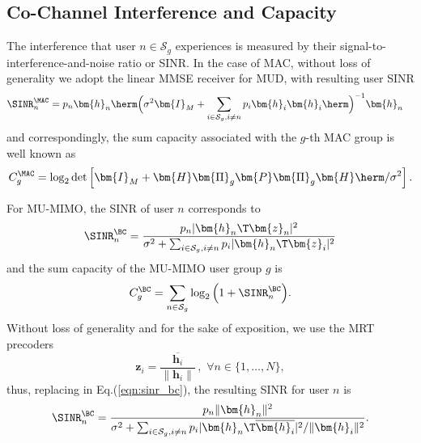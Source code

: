\subsection{Co-Channel Interference and Capacity}
The interference that user $n\in\mathcal{S}_g$ experiences is measured by their signal-to-interference-and-noise ratio or SINR. In the case of MAC, without loss of generality we adopt the linear MMSE receiver for MUD, with resulting user SINR \cite{Tse05}
\begin{align}
	\SINR_n^{\MAC}&=p_n\bm{h}_n\herm\Big(\sigma^2\bm{I}_M+\sum_{i\in\mathcal{S}_{g},i\neq n}p_i\bm{h}_i\bm{h}_i\herm\Big)^{-1}\bm{h}_n
	\label{eqn:sinr_mac}
\end{align}
and correspondingly, the sum capacity associated with the $g$-th MAC group is well known as
\begin{equation}
	C_g^{\MAC}={\log _2}\det\left[ \bm{I}_M + \bm{H}\bm{\Pi}_g\bm{P}\bm{\Pi}_g\bm{H}\herm/\sigma^2 \right].\label{eqn:cap_mac}
\end{equation}

For MU-MIMO, the SINR of user $n$ corresponds to 
\begin{equation}
	\SINR_n^{\BC} = \frac{p_n|\bm{h}_n\T\bm{z}_n|^2}{\sigma^2+\sum_{i\in\mathcal{S}_{g},i\neq n}p_i|\bm{h}_n\T\bm{z}_i|^2}
	\label{eqn:sinr_bc}
\end{equation}
and the sum capacity of the MU-MIMO user group $g$ is 
\begin{equation}
	C_g^{\BC}=\sum_{n\in\mathcal{S}_g}\log_2\Big(1+\SINR_n^{\BC}\Big).\label{eqn:cap_bc}
\end{equation}
Without loss of generality and for the sake of exposition, we use the MRT precoders \cite{Lo1999mrt}
\begin{equation}
	\bm{z}_i=\frac{\overline{\bm{h}_i}}{\|\bm{h}_i\|}\,,\,\,\forall n\in\{1,\ldots,N\},
\end{equation}
thus, replacing in Eq.(\ref{eqn:sinr_bc}), the resulting SINR for user $n$ is
\begin{equation}
	\SINR_n^{\BC} = \frac{p_n\|\bm{h}_n\|^2}{\sigma^2+\sum_{i\in\mathcal{S}_{g},i\neq n}p_i|\bm{h}_n\T\overline{\bm{h}_i}|^2/\|\bm{h}_i\|^2}.
\end{equation}




